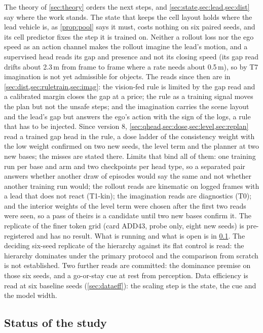 \documentclass[10pt,twocolumn]{article}
\theoremstyle{remark}
\begin{document}
The theory of \cref{sec:theory} orders the next steps, and \cref{sec:state,sec:lead,sec:dist} say where the work stands. The state that keeps the cell layout holds where the lead vehicle is, as \cref{prop:pool} says it must, costs nothing on six paired seeds, and its cell predictor fixes the step it is trained on. Neither a rollout loss nor the ego speed as an action channel makes the rollout imagine the lead's motion, and a supervised head reads its gap and presence and not its closing speed (its gap read drifts about 2.3\,m from frame to frame where a rate needs about 0.5\,m), so by T7 imagination is not yet admissible for objects. The reads since then are in \cref{sec:dist,sec:ruletrain,sec:imag}: the vision-fed rule is limited by the gap read and a calibrated margin closes the gap at a price; the rule as a training signal moves the plan but not the unsafe steps; and the imagination carries the scene layout and the lead's gap but answers the ego's action with the sign of the logs, a rule that has to be injected. Since version 8, \cref{sec:qhead,sec:dose,sec:level,sec:replan} read a trained gap head in the rule, a dose ladder of the consistency weight with the low weight confirmed on two new seeds, the level term and the planner at two new bases; the misses are stated there. Limits that bind all of them: one training run per base and arm and two checkpoints per head type, so a separated pair answers whether another draw of episodes would say the same and not whether another training run would; the rollout reads are kinematic on logged frames with a lead that does not react (T1-kin); the imagination reads are diagnostics (T0); and the interior weights of the level term were chosen after the first two reads were seen, so a pass of theirs is a candidate until two new bases confirm it. The replicate of the finer token grid (card ADD43, probe only, eight new seeds) is pre-registered and has no result. What is running and what is open is in \cref{sec:status}. The deciding six-seed replicate of the hierarchy against its flat control is read: the hierarchy dominates under the primary
protocol and the comparison from scratch is not established. Two further reads are committed: the
dominance premise on those six seeds, and a go-or-stay cue at rest from perception. Data efficiency is read at six baseline seeds (\cref{sec:dataeff}): the scaling step is the state, the cue and the model width.

\subsection{Status of the study}\label{sec:status}
\end{document}
